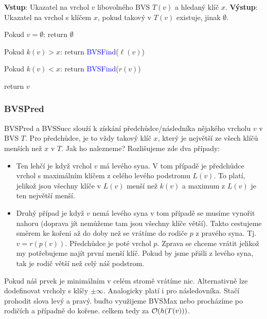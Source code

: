 \noindent \textbf{Vstup}: Ukazatel na vrchol $v$ libovolného BVS $T(v)$ a hledaný klíč $x$. \newline
\noindent \textbf{Výstup}: Ukazatel na vrchol s klíčem $x$, pokud takový v $T(v)$
existuje, jinak $\emptyset$. \newline
{}
\begin{pseudocode}
    \item Pokud $v = \emptyset$: return $\emptyset$
    \item Pokud $k(v) > x$: return \textcolor{blue}{BVSFind}($\ell(v)$)
    \item Pokud $k(v) < x$: return \textcolor{blue}{BVSFind}($r(v)$)
    \item return $v$
\end{pseudocode} \bigskip

\subsubsection{BVSPred}

\noindent BVSPred a BVSSucc slouží k získání předchůdce/následníka nějakého vrcholu $v$ v BVS $T$. Pro předchůdce, je to vždy takový klíč $x$, který je největší ze všech klíčů menších než $x$ v $T$. Jak ho nalezneme? Rozlišujeme zde dva případy:
\begin{itemize}
    \item Ten lehčí je když vrchol $v$ má levého syna. V tom případě je předchůdce vrchol s maximálním klíčem z celého levého podstromu $L(v)$. To platí, jelikož jsou všechny klíče v $L(v)$ menší než $k(v)$ a maximum z $L(v)$ je ten největší menší.
    \item Druhý případ je když $v$ nemá levého syna v tom případě se musíme vynořit nahoru (doprava jít nemůžeme tam jsou všechny klíče větší). Takto cestujeme směrem ke kořeni až do doby než se vrátíme do rodiče $p$ z pravého syna. Tj. $v = r(p(v))$. Předchůdce je poté vrchol $p$. Zprava se chceme vrátit jelikož my potřebujeme najít první menší klíč. Pokud by jsme přišli z levého syna, tak je rodič větší než celý náš podstrom.
\end{itemize}
Pokud náš prvek je minimálním v celém stromě vrátíme nic. Alternativně lze dodefinovat vrcholy s klíčy $\pm\infty$.\newline
Analogicky platí i pro následovníka. Stačí prohodit slova levý a pravý.
buďto využijeme BVSMax nebo procházíme po rodičích a případně do kořene. celkem tedy za $\mathcal{O}(h(T(v)))$. \bigskip

